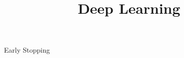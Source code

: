 




\newcommand{\titlefigure}{figure/earlystop.png}
\newcommand{\learninggoals}{
  \item Concept of early stopping
  \item Advantages and disadvantages
  \item Connection to weight decay
}

\title{Deep Learning}
\date{}




\begin{vbframe}{Early Stopping}
  

\end{vbframe}
